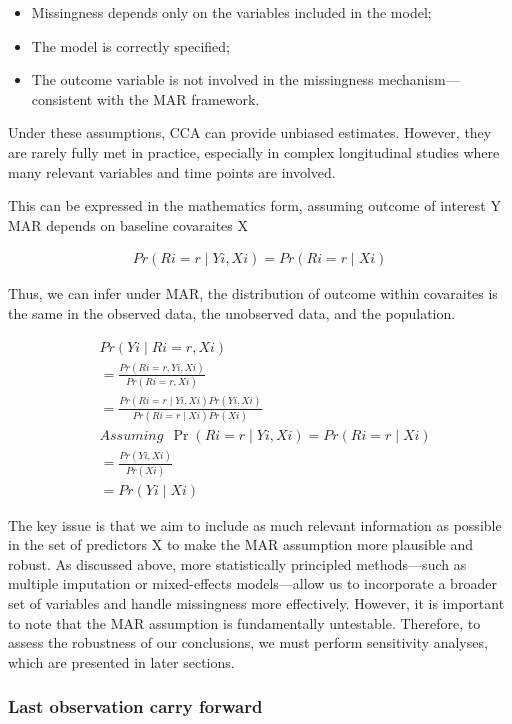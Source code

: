 \documentclass{article}
\providecommand{\tightlist}{%
  \setlength{\itemsep}{0pt}\setlength{\parskip}{0pt}}
\begin{document}
\begin{itemize}
\tightlist
\item
  Missingness depends only on the variables included in the model;
\item
  The model is correctly specified;
\item
  The outcome variable is not involved in the missingness
  mechanism---consistent with the MAR framework.
\end{itemize}

Under these assumptions, CCA can provide unbiased estimates. However,
they are rarely fully met in practice, especially in complex
longitudinal studies where many relevant variables and time points are
involved.

This can be expressed in the mathematics form, assuming outcome of
interest Y MAR depends on baseline covaraites X

\begin{align*}
  Pr(Ri=r \mid Yi, Xi) = Pr(Ri=r \mid Xi)
  \end{align*}

Thus, we can infer under MAR, the distribution of outcome within
covaraites is the same in the observed data, the unobserved data, and
the population.

\begin{align*}
  & Pr(Yi \mid Ri=r, Xi) \\ 
  & = \displaystyle \frac{Pr(Ri=r,Yi,Xi)}{Pr(Ri=r,Xi)} \\
  & = \displaystyle \frac{Pr(Ri=r \mid Yi,Xi)Pr(Yi,Xi)}{Pr(Ri=r \mid Xi)Pr(Xi)} 
  \\
  & Assuming \ \ \Pr(Ri=r \mid Yi, Xi) = Pr(Ri=r \mid Xi) \\
  & = \displaystyle \frac{Pr(Yi,Xi)}{Pr(Xi)} \\
  & = Pr(Yi \mid Xi)
  \end{align*}

The key issue is that we aim to include as much relevant information as
possible in the set of predictors X to make the MAR assumption more
plausible and robust. As discussed above, more statistically principled
methods---such as multiple imputation or mixed-effects models---allow us
to incorporate a broader set of variables and handle missingness more
effectively. However, it is important to note that the MAR assumption is
fundamentally untestable. Therefore, to assess the robustness of our
conclusions, we must perform sensitivity analyses, which are presented
in later sections.

\subsubsection{Last observation carry
forward}\label{last-observation-carry-forward}
\end{document}

